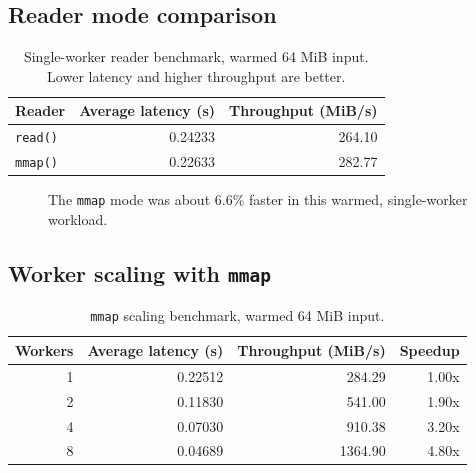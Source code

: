 \documentclass[11pt]{article}
\begin{document}
\subsection{Reader mode comparison}

\begin{table}[ht]
\centering
\caption{Single-worker reader benchmark, warmed 64 MiB input. Lower latency and
higher throughput are better.}
\begin{tabular}{lrr}
\toprule
Reader & Average latency (s) & Throughput (MiB/s) \\
\midrule
\texttt{read()} & 0.24233 & 264.10 \\
\texttt{mmap()} & 0.22633 & 282.77 \\
\bottomrule
\end{tabular}
\end{table}

\begin{figure}[ht]
\centering
{}
\caption{The \texttt{mmap} mode was about 6.6\% faster in this warmed,
single-worker workload.}
\end{figure}
\FloatBarrier

\subsection{Worker scaling with \texttt{mmap}}

\begin{table}[ht]
\centering
\caption{\texttt{mmap} scaling benchmark, warmed 64 MiB input.}
\begin{tabular}{rrrr}
\toprule
Workers & Average latency (s) & Throughput (MiB/s) & Speedup \\
\midrule
1 & 0.22512 & 284.29 & 1.00x \\
2 & 0.11830 & 541.00 & 1.90x \\
4 & 0.07030 & 910.38 & 3.20x \\
8 & 0.04689 & 1364.90 & 4.80x \\
\bottomrule
\end{tabular}
\end{table}
\end{document}

